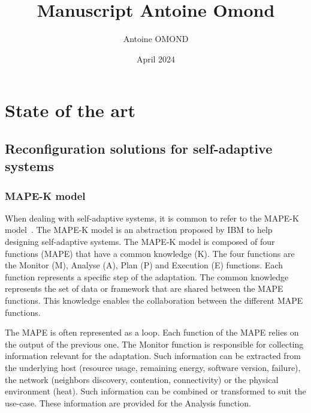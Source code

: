 \documentclass{article}
\title{Manuscript Antoine Omond}
\author{Antoine OMOND}
\date{April 2024}
\begin{document}
\maketitle

\section{State of the art}
\subsection{Reconfiguration solutions for self-adaptive systems}

\subsubsection{MAPE-K model}

When dealing with self-adaptive systems, it is common to refer to the MAPE-K model~\cite{kephart_vision_2003}. The MAPE-K model is an abstraction proposed by IBM to help designing self-adaptive systems. The MAPE-K model is composed of four functions (MAPE) that have a common knowledge (K). The four functions are the Monitor (M), Analyse (A), Plan (P) and Execution (E) functions. Each function represents a specific step of the adaptation. The common knowledge represents the set of data or framework that are shared between the MAPE functions. This knowledge enables the collaboration between the different MAPE functions.
 
The MAPE is often represented as a loop. Each function of the MAPE relies on the output of the previous one. The Monitor function is responsible for collecting information relevant for the adaptation. Such information can be extracted from the underlying host (\eg resource usage, remaining energy, software version, failure), the network (\eg neighbors discovery, contention, connectivity) or the physical environment (\eg heat). Such information can be combined or transformed to suit the use-case. These information are provided for the Analysis function.


\end{document}
